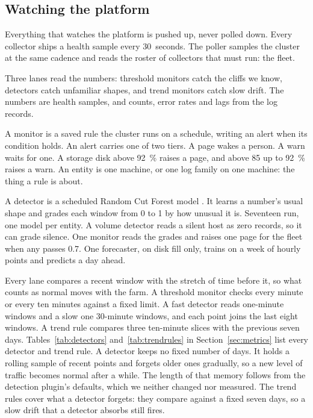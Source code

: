 \subsection{Watching the platform}\label{sec:design-watch}

Everything that watches the platform is pushed up, never polled down. Every collector ships a health sample every 30~seconds. The poller samples the cluster at the same cadence and reads the roster of collectors that must run: the fleet.

Three lanes read the numbers: threshold monitors catch the cliffs we know, detectors catch unfamiliar shapes, and trend monitors catch slow drift. The numbers are health samples, and counts, error rates and lags from the log records.

A monitor is a saved rule the cluster runs on a schedule, writing an alert when its condition holds. An alert carries one of two tiers. A page wakes a person. A warn waits for one. A storage disk above 92~\% raises a page, and above 85 up to 92~\% raises a warn. An entity is one machine, or one log family on one machine: the thing a rule is about.

A detector is a scheduled Random Cut Forest model \cite{ref:rcf}. It learns a number's usual shape and grades each window from 0 to 1 by how unusual it is. Seventeen run, one model per entity. A volume detector reads a silent host as zero records, so it can grade silence. One monitor reads the grades and raises one page for the fleet when any passes 0.7. One forecaster, on disk fill only, trains on a week of hourly points and predicts a day ahead.

Every lane compares a recent window with the stretch of time before it, so what counts as normal moves with the farm. A threshold monitor checks every minute or every ten minutes against a fixed limit. A fast detector reads one-minute windows and a slow one 30-minute windows, and each point joins the last eight windows. A trend rule compares three ten-minute slices with the previous seven days. Tables~\ref{tab:detectors} and~\ref{tab:trendrules} in Section~\ref{sec:metrics} list every detector and trend rule. A detector keeps no fixed number of days. It holds a rolling sample of recent points and forgets older ones gradually, so a new level of traffic becomes normal after a while. The length of that memory follows from the detection plugin's defaults, which we neither changed nor measured. The trend rules cover what a detector forgets: they compare against a fixed seven days, so a slow drift that a detector absorbs still fires.

